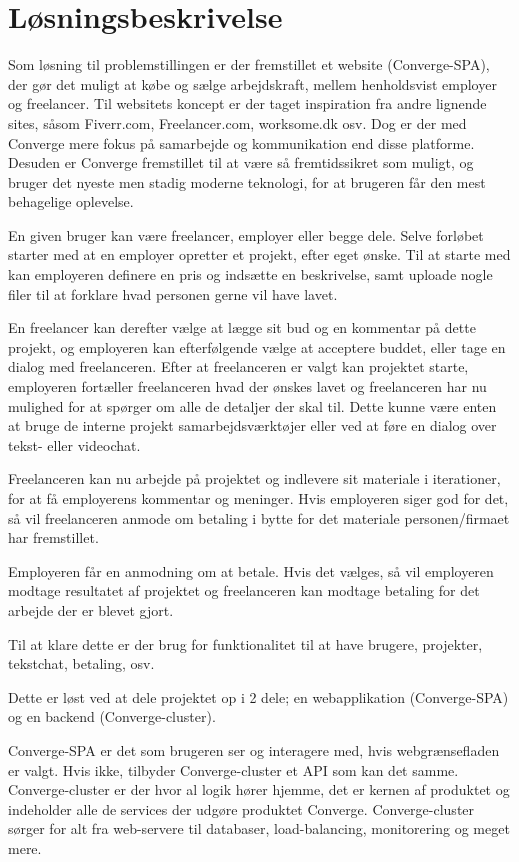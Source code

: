 \section{Løsningsbeskrivelse}

Som løsning til problemstillingen er der fremstillet et website (Converge-SPA), der gør det muligt at købe og sælge arbejdskraft, mellem henholdsvist employer og freelancer. Til websitets koncept er der taget inspiration fra andre lignende sites, såsom Fiverr.com, Freelancer.com, worksome.dk osv. Dog er der med Converge mere fokus på samarbejde og kommunikation end disse platforme. Desuden er Converge fremstillet til at være så fremtidssikret som muligt, og bruger det nyeste men stadig moderne teknologi, for at brugeren får den mest behagelige oplevelse.

En given bruger kan være freelancer, employer eller begge dele. Selve forløbet starter med at en employer opretter et projekt, efter eget ønske. Til at starte med kan employeren definere en pris og indsætte en beskrivelse, samt uploade nogle filer til at forklare hvad personen gerne vil have lavet.

En freelancer kan derefter vælge at lægge sit bud og en kommentar på dette projekt, og employeren kan efterfølgende vælge at acceptere buddet, eller tage en dialog med freelanceren. Efter at freelanceren er valgt kan projektet starte, employeren fortæller freelanceren hvad der ønskes lavet og freelanceren har nu mulighed for at spørger om alle de detaljer der skal til. Dette kunne være enten at bruge de interne projekt samarbejdsværktøjer eller ved at føre en dialog over tekst- eller videochat.

Freelanceren kan nu arbejde på projektet og indlevere sit materiale i iterationer, for at få employerens kommentar og meninger. Hvis employeren siger god for det, så vil freelanceren anmode om betaling i bytte for det materiale personen/firmaet har fremstillet.

Employeren får en anmodning om at betale. Hvis det vælges, så vil employeren modtage resultatet af projektet og freelanceren kan modtage betaling for det arbejde der er blevet gjort.

Til at klare dette er der brug for funktionalitet til at have brugere, projekter, tekstchat, betaling, osv.

Dette er løst ved at dele projektet op i 2 dele; en webapplikation (Converge-SPA) og en backend (Converge-cluster).


Converge-SPA er det som brugeren ser og interagere med, hvis webgrænsefladen er valgt. Hvis ikke, tilbyder Converge-cluster et API som kan det samme. Converge-cluster er der hvor al logik hører hjemme, det er kernen af produktet og indeholder alle de services der udgøre produktet Converge. Converge-cluster sørger for alt fra web-servere til databaser, load-balancing, monitorering og meget mere.